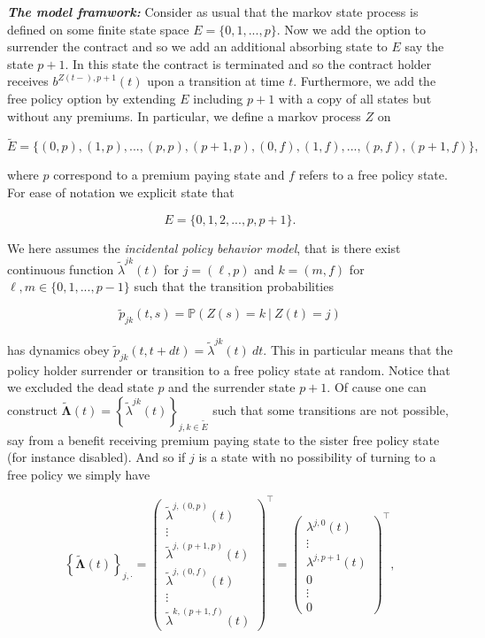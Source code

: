 \documentclass[a4paper,10pt,openany]{book}
\begin{document}
\emph{\textbf{The model framwork:}} Consider as usual that the markov state process is defined on some finite state space \(E=\{0,1,...,p\}\). Now we add the option to surrender the contract and so we add an additional absorbing state to \(E\) say the state \(p+1\). In this state the contract is terminated and so the contract holder receives \(b^{Z(t-),p+1}(t)\) upon a transition at time \(t\). Furthermore, we add the free policy option by extending \(E\) including \(p+1\) with a copy of all states but without any premiums. In particular, we define a markov process \(Z\) on

\[
\widetilde E=\{(0,p),(1,p),...,(p,p),(p+1,p),(0,f),(1,f),...,(p,f),(p+1,f)\},
\]

where \(p\) correspond to a premium paying state and \(f\) refers to a free policy state. For ease of notation we explicit state that

\[
E=\{0,1,2,...,p,p+1\}.
\]

We here assumes the \emph{incidental policy behavior model}, that is there exist continuous function \(\widetilde\lambda^{jk}(t)\) for \(j=(\ell,p)\) and \(k=(m,f)\) for \(\ell, m\in\{0,1,...,p-1\}\) such that the transition probabilities

\[
\widetilde p_{jk}(t,s)=\mathbb P(Z(s)=k\ \vert\ Z(t)=j)
\]

has dynamics obey \(\widetilde p_{jk}(t,t+dt)=\widetilde \lambda^{jk}(t)\ dt\). This in particular means that the policy holder surrender or transition to a free policy state at random. Notice that we excluded the dead state \(p\) and the surrender state \(p+1\). Of cause one can construct \(\widetilde {\mathbf \Lambda}(t)=\left\{\widetilde \lambda^{jk}(t)\right\}_{j,k\in \widetilde E}\) such that some transitions are not possible, say from a benefit receiving premium paying state to the sister free policy state (for instance disabled). And so if \(j\) is a state with no possibility of turning to a free policy we simply have

\[
\left\{\widetilde {\mathbf \Lambda}(t)\right\}_{j,\cdot}=
\begin{pmatrix}
\widetilde\lambda^{j,(0,p)}(t)\\
\vdots\\
\widetilde\lambda^{j,(p+1,p)}(t)\\
\widetilde\lambda^{j,(0,f)}(t)\\
\vdots\\
\widetilde\lambda^{k,(p+1,f)}(t)
\end{pmatrix}^\top=
\begin{pmatrix}
\lambda^{j,0}(t)\\
\vdots\\
\lambda^{j,p+1}(t)\\
0\\
\vdots\\
0
\end{pmatrix}^\top,
\]
\end{document}
